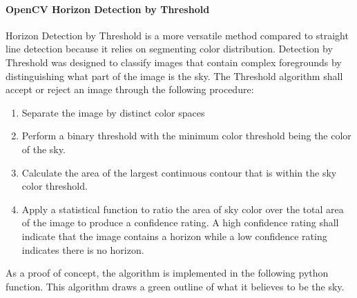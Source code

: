 \documentclass[onecolumn, draftclsnofoot,10pt, compsoc]{IEEEtran}
\begin{document}
\begin{singlespace}
				\paragraph{OpenCV Horizon Detection by Threshold}
					Horizon Detection by Threshold is a more versatile method compared to straight line detection because it relies on segmenting color distribution. Detection by Threshold was designed to classify images that contain complex foregrounds by distinguishing what part of the image is the sky. The Threshold algorithm shall accept or reject an image through the following procedure:
					\begin{enumerate}
						\item Separate the image by distinct color spaces
						\item Perform a binary threshold with the minimum color threshold being the color of the sky.
						\item Calculate the area of the largest continuous contour that is within the sky color threshold.
						\item Apply a statistical function to ratio the area of sky color over the total area of the image to produce a confidence rating. A high confidence rating shall indicate that the image contains a horizon while a low confidence rating indicates there is no horizon.
					\end{enumerate}

					As a proof of concept, the algorithm is implemented in the following python function. This algorithm draws a green outline of what it believes to be the sky.

					


\end{singlespace}
\end{document}
